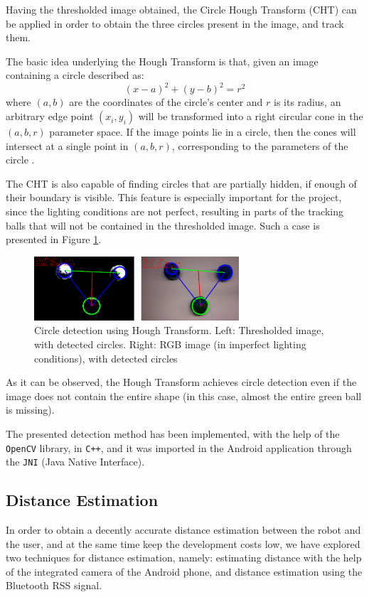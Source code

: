 \documentclass[journal]{IEEEtran}
\let\MYoriglatexcaption\caption
\renewcommand{\caption}[2][\relax]{\MYoriglatexcaption[#2]{#2}}
\begin{document}
Having the thresholded image obtained, the Circle Hough Transform (CHT) can be applied in order to obtain the three circles present in the image, and track them.

The basic idea underlying the Hough Transform is that, given an image containing a circle described as:
\begin{equation}
\left(x-a\right)^2 + \left(y-b\right)^2 = r^2
\end{equation}
where $(a,b)$ are the coordinates of the circle's center and $r$ is its radius, an arbitrary edge point $(x_i, y_i)$ will be transformed into a right circular cone in the $(a,b,r)$ parameter space. If the image points lie in a circle, then the cones will intersect at a single point in $(a,b,r)$, corresponding to the parameters of the circle .

The CHT is also capable of finding circles that are partially hidden, if enough of their boundary is visible. This feature is especially important for the project, since the lighting conditions are not perfect, resulting in parts of the tracking balls that will not be contained in the thresholded image. Such a case is presented in Figure \ref{fig:cht}.
\begin{figure}[!htpb]
\centering
\includegraphics[width=3in]{images/cht_incomplete}
\caption{Circle detection using Hough Transform. Left: Thresholded image, with detected circles. Right: RGB image (in imperfect lighting conditions), with detected circles}
\label{fig:cht}
\end{figure}

As it can be observed, the Hough Transform achieves circle detection even if the image does not contain the entire shape (in this case, almost the entire green ball is missing).

The presented detection method has been implemented, with the help of the \texttt{OpenCV} library, in \texttt{C++}, and it was imported in the Android application through the \texttt{JNI} (Java Native Interface).

\subsection{Distance Estimation}
In order to obtain a decently accurate distance estimation between the robot and the user, and at the same time keep the development costs low, we have explored two techniques for distance estimation, namely: estimating distance with the help of the integrated camera of the Android phone, and distance estimation using the Bluetooth RSS signal.
\end{document}
